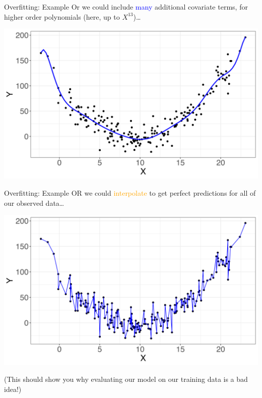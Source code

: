 \documentclass[10pt,t]{beamer}
\begin{document}
\begin{frame}{Overfitting: Example}
Or we could include  \textcolor{blue}{many} additional covariate terms, for higher order polynomials (here, up to $X^{13}$)\dots

\vspace{0.3cm}

\centering \includegraphics[scale=0.4]{figures/overfit4.png}

\end{frame}

\begin{frame}{Overfitting: Example}
OR we could \textcolor{orange}{interpolate} to get perfect predictions for all of our observed data\dots

\vspace{0.3cm}

\begin{center}
	 \includegraphics[scale=0.4]{figures/overfit5.png}
\end{center}
\begin{footnotesize}
	\vspace{-0.1cm}
(This should show you why evaluating our model on our training data is a bad idea!)
\end{footnotesize}
\end{frame}
\end{document}
